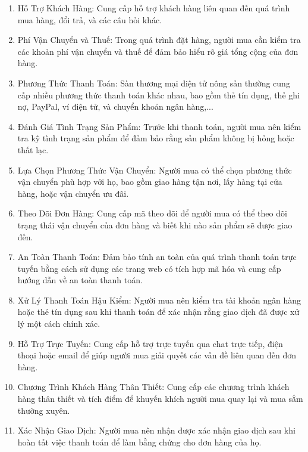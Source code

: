 \begin{enumerate}
            \item Hỗ Trợ Khách Hàng:
        Cung cấp hỗ trợ khách hàng liên quan đến quá trình mua hàng, đổi trả, và các câu hỏi khác.
            \item Phí Vận Chuyển và Thuế:
        Trong quá trình đặt hàng, người mua cần kiểm tra các khoản phí vận chuyển và thuế để đảm bảo hiểu rõ giá tổng cộng của đơn hàng.
            \item Phương Thức Thanh Toán:
        Sàn thương mại điện tử nông sản thường cung cấp nhiều phương thức thanh toán khác nhau, bao gồm thẻ tín dụng, thẻ ghi nợ, PayPal, ví điện tử, và chuyển khoản ngân hàng,...
            \item Đánh Giá Tình Trạng Sản Phẩm:
        Trước khi thanh toán, người mua nên kiểm tra kỹ tình trạng sản phẩm để đảm bảo rằng sản phẩm không bị hỏng hoặc thất lạc.
            \item Lựa Chọn Phương Thức Vận Chuyển:
        Người mua có thể chọn phương thức vận chuyển phù hợp với họ, bao gồm giao hàng tận nơi, lấy hàng tại cửa hàng, hoặc vận chuyển ưu đãi.
            \item Theo Dõi Đơn Hàng:
        Cung cấp mã theo dõi để người mua có thể theo dõi trạng thái vận chuyển của đơn hàng và biết khi nào sản phẩm sẽ được giao đến.
            \item An Toàn Thanh Toán:
        Đảm bảo tính an toàn của quá trình thanh toán trực tuyến bằng cách sử dụng các trang web có tích hợp mã hóa và cung cấp hướng dẫn về an toàn thanh toán.
            \item Xử Lý Thanh Toán Hậu Kiểm:
        Người mua nên kiểm tra tài khoản ngân hàng hoặc thẻ tín dụng sau khi thanh toán để xác nhận rằng giao dịch đã được xử lý một cách chính xác.
            \item Hỗ Trợ Trực Tuyến:
        Cung cấp hỗ trợ trực tuyến qua chat trực tiếp, điện thoại hoặc email để giúp người mua giải quyết các vấn đề liên quan đến đơn hàng.
            \item Chương Trình Khách Hàng Thân Thiết:
        Cung cấp các chương trình khách hàng thân thiết và tích điểm để khuyến khích người mua quay lại và mua sắm thường xuyên.
            \item Xác Nhận Giao Dịch:
        Người mua nên nhận được xác nhận giao dịch sau khi hoàn tất việc thanh toán để làm bằng chứng cho đơn hàng của họ.
        \end{enumerate}

